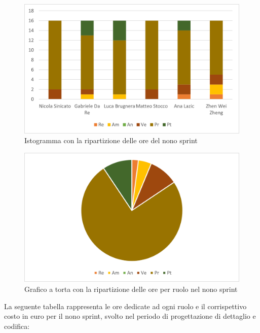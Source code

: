 \begin{figure}[H]
    \centering
    \includegraphics[scale=0.6]{img/grafi preventivo/istogrammi/codifica/periodo2.png}
    \caption{Istogramma con la ripartizione delle ore del nono sprint}
\end{figure}
\begin{figure}[H]
    \centering
    \includegraphics[scale=0.6]{img/grafi preventivo/torta/codifica/periodo2.png}
    \caption{Grafico a torta con la ripartizione delle ore per ruolo nel nono sprint}
\end{figure}
La seguente tabella rappresenta le ore dedicate ad ogni ruolo e il corrispettivo costo in euro per il nono sprint, svolto nel periodo di progettazione di dettaglio e codifica: 

